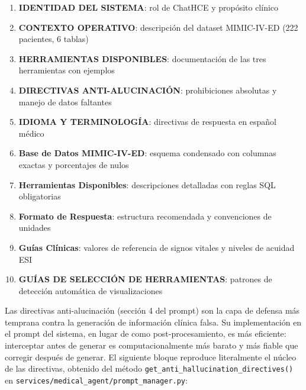 \begin{enumerate}[nosep, leftmargin=*]
  \item \textbf{IDENTIDAD DEL SISTEMA}: rol de ChatHCE y propósito clínico
  \item \textbf{CONTEXTO OPERATIVO}: descripción del dataset MIMIC-IV-ED (222 pacientes, 6 tablas)
  \item \textbf{HERRAMIENTAS DISPONIBLES}: documentación de las tres herramientas con ejemplos
  \item \textbf{DIRECTIVAS ANTI-ALUCINACIÓN}: prohibiciones absolutas y manejo de datos faltantes
  \item \textbf{IDIOMA Y TERMINOLOGÍA}: directivas de respuesta en español médico
  \item \textbf{Base de Datos MIMIC-IV-ED}: esquema condensado con columnas exactas y porcentajes de nulos
  \item \textbf{Herramientas Disponibles}: descripciones detalladas con reglas SQL obligatorias
  \item \textbf{Formato de Respuesta}: estructura recomendada y convenciones de unidades
  \item \textbf{Guías Clínicas}: valores de referencia de signos vitales y niveles de acuidad ESI
  \item \textbf{GUÍAS DE SELECCIÓN DE HERRAMIENTAS}: patrones de detección automática de visualizaciones
\end{enumerate}

Las directivas anti-alucinación (sección 4 del prompt) son la capa de defensa más temprana contra la generación de información clínica falsa. Su implementación en el prompt del sistema, en lugar de como post-procesamiento, es más eficiente: interceptar antes de generar es computacionalmente más barato y más fiable que corregir después de generar. El siguiente bloque reproduce literalmente el núcleo de las directivas, obtenido del método \texttt{get\_anti\_hallucination\_directives()} en \texttt{services/medical\_agent/prompt\_manager.py}:

